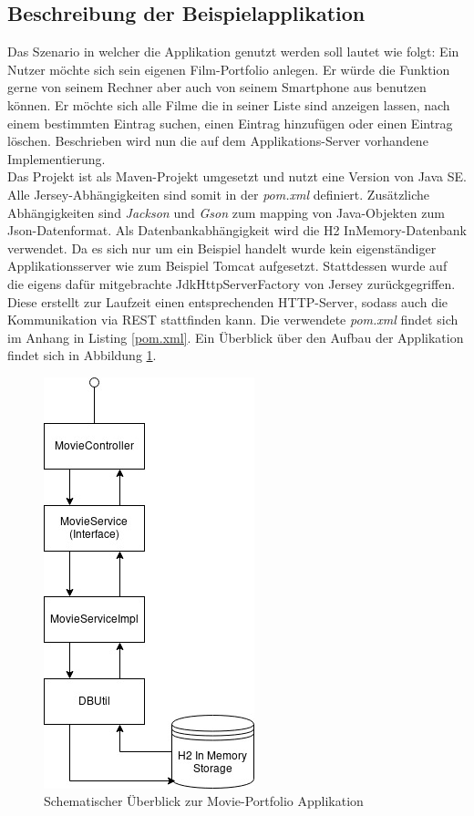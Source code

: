 \documentclass[fleqn,10.5pt,ngerman]{SelfArx}
\begin{document}
\subsection{Beschreibung der Beispielapplikation}
Das Szenario in welcher die Applikation genutzt werden soll lautet wie folgt: Ein Nutzer möchte sich sein eigenen Film-Portfolio anlegen. Er würde die Funktion gerne von seinem Rechner aber auch von seinem Smartphone aus benutzen können. Er möchte sich alle Filme die in seiner Liste sind anzeigen lassen, nach einem bestimmten Eintrag suchen, einen Eintrag hinzufügen oder einen Eintrag löschen. Beschrieben wird nun die auf dem Applikations-Server vorhandene Implementierung. \\ Das Projekt ist als Maven-Projekt umgesetzt und nutzt eine Version von Java SE. Alle Jersey-Abhängigkeiten sind somit in der \textit{pom.xml} definiert. Zusätzliche Abhängigkeiten sind \textit{Jackson} und \textit{Gson} zum mapping von Java-Objekten zum Json-Datenformat. Als Datenbankabhängigkeit wird die H2 InMemory-Datenbank verwendet. Da es sich nur um ein Beispiel handelt wurde kein eigenständiger Applikationsserver wie zum Beispiel Tomcat aufgesetzt. Stattdessen wurde auf die eigens dafür mitgebrachte JdkHttpServerFactory von Jersey zurückgegriffen. Diese erstellt zur Laufzeit einen entsprechenden HTTP-Server, sodass auch die Kommunikation via REST stattfinden kann. Die verwendete \textit{pom.xml} findet sich im Anhang in Listing \ref{pom.xml}.
Ein Überblick über den Aufbau der Applikation findet sich in Abbildung \ref{fig:overview}.
\begin{figure}[ht]\centering
	\includegraphics[width=6 cm]{Abbildungen/overview.jpg}
	\caption{Schematischer Überblick zur Movie-Portfolio Applikation}
	\label{fig:overview}
\end{figure}
\end{document}
